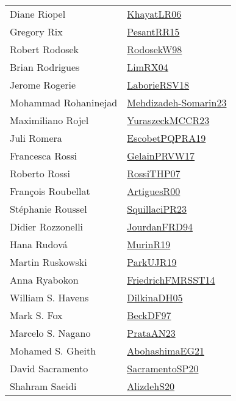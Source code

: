 {\begin{longtable}{p{4cm}p{20cm}}
Diane Riopel & \href{articles/KhayatLR06.pdf}{KhayatLR06}\cite{KhayatLR06} \\
Gregory Rix & \href{papers/PesantRR15.pdf}{PesantRR15}\cite{PesantRR15} \\
Robert Rodosek & \href{papers/RodosekW98.pdf}{RodosekW98}\cite{RodosekW98} \\
Brian Rodrigues & \href{papers/LimRX04.pdf}{LimRX04}\cite{LimRX04} \\
Jerome Rogerie & \href{articles/LaborieRSV18.pdf}{LaborieRSV18}\cite{LaborieRSV18} \\
Mohammad Rohaninejad & \href{papers/Mehdizadeh-Somarin23.pdf}{Mehdizadeh-Somarin23}\cite{Mehdizadeh-Somarin23} \\
Maximiliano Rojel & \href{articles/YuraszeckMCCR23.pdf}{YuraszeckMCCR23}\cite{YuraszeckMCCR23} \\
Juli Romera & \href{articles/EscobetPQPRA19.pdf}{EscobetPQPRA19}\cite{EscobetPQPRA19} \\
Francesca Rossi & \href{papers/GelainPRVW17.pdf}{GelainPRVW17}\cite{GelainPRVW17} \\
Roberto Rossi & \href{papers/RossiTHP07.pdf}{RossiTHP07}\cite{RossiTHP07} \\
Fran{\c{c}}ois Roubellat & \href{articles/ArtiguesR00.pdf}{ArtiguesR00}\cite{ArtiguesR00} \\
St{\'{e}}phanie Roussel & \href{papers/SquillaciPR23.pdf}{SquillaciPR23}\cite{SquillaciPR23} \\
Didier Rozzonelli & \href{}{JourdanFRD94}\cite{JourdanFRD94} \\
Hana Rudov{\'{a}} & \href{papers/MurinR19.pdf}{MurinR19}\cite{MurinR19} \\
Martin Ruskowski & \href{papers/ParkUJR19.pdf}{ParkUJR19}\cite{ParkUJR19} \\
Anna Ryabokon & \href{}{FriedrichFMRSST14}\cite{FriedrichFMRSST14} \\
William S. Havens & \href{papers/DilkinaDH05.pdf}{DilkinaDH05}\cite{DilkinaDH05} \\
Mark S. Fox & \href{papers/BeckDF97.pdf}{BeckDF97}\cite{BeckDF97} \\
Marcelo S. Nagano & \href{articles/PrataAN23.pdf}{PrataAN23}\cite{PrataAN23} \\
Mohamed S. Gheith & \href{articles/AbohashimaEG21.pdf}{AbohashimaEG21}\cite{AbohashimaEG21} \\
David Sacramento & \href{articles/SacramentoSP20.pdf}{SacramentoSP20}\cite{SacramentoSP20} \\
Shahram Saeidi & \href{}{AlizdehS20}\cite{AlizdehS20} \\

\end{longtable}}

